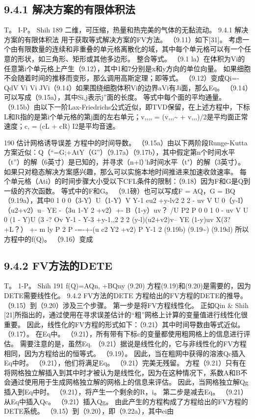 \documentclass[UTF8,11pt,a4paper,openany,fontset=fandol]{ctexbook}
\begin{document}
\subsection{9.4.1 解决方案的有限体积法}
T。 I-P。 Shih 189 二维，可压缩，热量和热完美的气体的无黏流动。 9.4.1 解决方案的有限体积法 用于获取等式解决方案的FV方法。 （9.11）如下[31]。 考虑一个由有限数量的连续和非重叠的单元格离散化的域，其中每个单元格可以有一个任意的形状，如三角形、矩形或其他多边形。 整合等式。 （9.1 la）在体积为Vi的任意第i个单元格上产生（9.12），其中1和7分别是x和y方向的单位向量。 如果细胞不会随着时间的推移而变形，那么调用高斯定理；即等式。 （9.12）变成Qi=- QdV Vi Vi JVi（9.14）如果围绕细胞体积Vi的边界aVi有Ji面，那么Eq。 （9.14）可以写成（9.15a），其中Si,j表示j”面的长度。 等式中每个面的平均通量。 （9.15b）由以下一阶Lax-Friedrichs公式近似，即TVD保留，在上述方程中，下标L和R指的是第i个单元格的第j面的左右单元；v,,,, = (v,,,\textasciitilde{} + v,,,)/2是平均面正常速度；c, = (cL + cR) I2是平均音速。

190 估计网格诱导误差 方程中的时间导数。 （9.15a）由以下两阶段Runge-Kutta方案近似：Q（“=G;+AtY（G”）（9.17a）（9.17b），其中假定第n个时间水平（t”）的解（6英寸）是已知的，并寻求（n+l）'h时间水平（t"）的解（3英寸）。 如果只对稳态解决方案感兴趣，那么可以实施本地时间推进来加速收敛速率。 每个单元格（Ati）的时间步骤大小受以下CFL条件的限制：（9.18）因为F和G是Q到一级的齐次函数。 等式中的F和G。 （9.1磅）也可以写成F = AQ，G = BQ（9.19a），其中0 1 0 0（3-Y）U（1-Y）V Y-1 eu2 +y-lv2 2 2 - uv V U 0（y-I）（u2+v2）u-- YE -（3u 1-Y 2 +v2）+- B（1-y）uv？ /U P2 P 0 0 1 0 - uv V U 0 (1 - Y)U (3 -? Ov Y-1 - Y-3 +y-1,,2 2 2 (y-l)(u2+v2)v-- YE (1-y)uv X(3? +L？） +- m ly P 2 P -=-+-(u c2 Y2 +v2) P Y-1 2 (9.19b) (9.19\textasciitilde{}) (9.19d) 所以方程中的f(Q)。 （9.16）变成

\subsection{9.4.2 FV方法的DETE}
T。 1-P。 Shih 191 f(Q)=AQn, +BQny (9.20) 方程(9.19)和(9.20)是需要的，因为DETE需要线性化。 9.4.2 FV方法的DETE 方程给出的FV方程的DETE的推导。 （9.15）到（9.20）涉及三个步骤。 第一步是将FV方程线性化。 正如Qin \& Shih [21]所指出的，通过使用在寻求误差估计的“粗”网格上计算的变量值进行线性化很重要。 因此，线性化的FV方程的形式如下：（9.21）其中时间导数由等式近似。 （9.17）。 在Eq中。 （9.21），所有带有下标c的变量都使用粗网格上的信息进行评估。 需要注意的是，虽然Eq. （9.21）据说是线性化的，它与非线性化的FV方程相同，因为方程给出的恒等式。 （9.19）。 因此，当在粗网中获得的溶液Qc插入Eq中时。 （9.21），他们将满足Eq。 （9.21）完美无残留。 方程（9.21）只有在将网格独立解插入到其中时才被认为是线性化，因为在这种情况下，系数A和B不会通过使用用于生成网格独立解的网格上的信息来评估。 因此，当网格独立解Qg插入到Eq中时。 （9.21），将产生一个剩余的R，i。 第二步是减去Eq。 （9.21）从Eq中插入Qc。 （9.21）插入Qg。 由此产生的方程构成了方程给出的FV方程的DETE系统。 （9.15）到（9.20），即（9.22a），其中ei由
\end{document}
